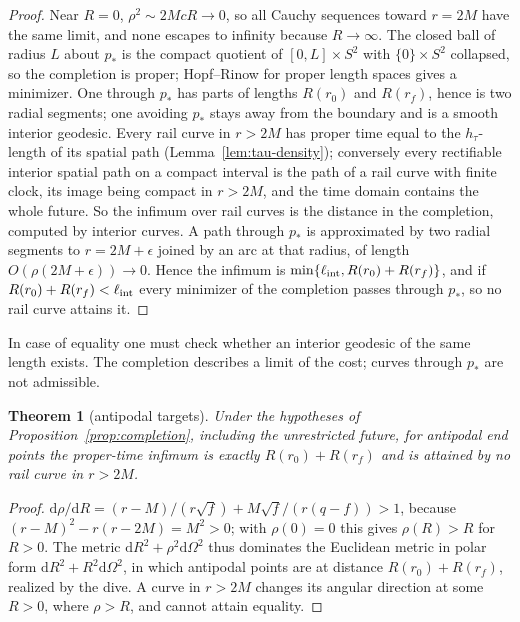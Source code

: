 \documentclass[aip,jmp,amsmath,amssymb,reprint]{revtex4-2}
\newcommand{\dd}{\mathrm{d}}
\theoremstyle{plain}
\newtheorem{theorem}{Theorem}
\theoremstyle{definition}
\begin{document}
\begin{proof}
Near $R=0$, $\rho^2\sim2McR\to0$, so all Cauchy sequences toward $r=2M$ have the same limit,
and none escapes to infinity because $R\to\infty$. The closed ball of radius $L$ about $p_*$
is the compact quotient of $[0,L]\times S^2$ with $\{0\}\times S^2$ collapsed, so the
completion is proper; Hopf--Rinow for proper length spaces gives a minimizer. One through
$p_*$ has parts of lengths $R(r_0)$ and $R(r_f)$, hence is two radial segments; one avoiding
$p_*$ stays away from the boundary and is a smooth interior geodesic. Every rail curve in $r>2M$ has proper time
equal to the $h_\tau$-length of its spatial path (Lemma~\ref{lem:tau-density}); conversely every rectifiable interior spatial path on a compact interval is the path of a rail curve with finite
clock, its image being compact in $r>2M$, and the
time domain contains the whole future. So the infimum over rail curves is the distance in the completion, computed by
interior curves. A path through $p_*$ is approximated by two radial segments to $r=2M+\epsilon$ joined by an arc at
that radius, of length $O(\rho(2M+\epsilon))\to0$. Hence the infimum is $\min\{\ell_{\rm int},R(r_0)+R(r_f)\}$, and if
$R(r_0)+R(r_f)<\ell_{\rm int}$ every minimizer of the completion passes through $p_*$, so no rail curve attains it.
\end{proof}

In case of equality one must check whether an interior geodesic of the same length exists.
The completion describes a limit of the cost; curves through $p_*$ are not admissible.

\begin{theorem}[antipodal targets]\label{thm:antipodal}
Under the hypotheses of Proposition~\ref{prop:completion}, including the unrestricted
future, for antipodal end points the
proper-time infimum is exactly $R(r_0)+R(r_f)$ and is attained by no rail curve in $r>2M$.
\end{theorem}

\begin{proof}
$\dd\rho/\dd R=(r-M)/(r\sqrt f)+M\sqrt f/(r(q-f))>1$, because $(r-M)^2-r(r-2M)=M^2>0$; with
$\rho(0)=0$ this gives $\rho(R)>R$ for $R>0$. The metric $\dd R^2+\rho^2\dd\Omega^2$ thus
dominates the Euclidean metric in polar form $\dd R^2+R^2\dd\Omega^2$, in which antipodal
points are at distance $R(r_0)+R(r_f)$, realized by the dive. A curve in $r>2M$ changes its
angular direction at some $R>0$, where $\rho>R$, and cannot attain equality.
\end{proof}
\end{document}
